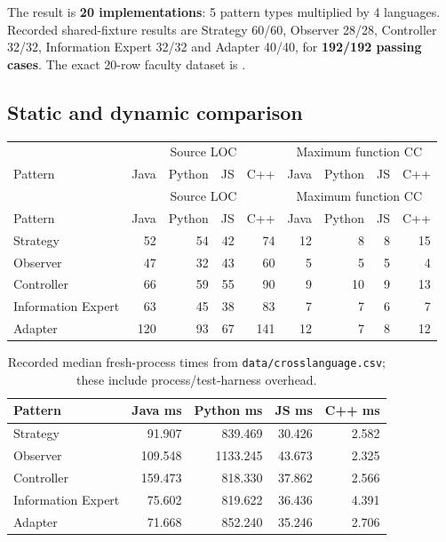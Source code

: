 \documentclass[11pt,a4paper]{article}
\renewcommand{\_}{\textunderscore\allowbreak}
\begin{document}
The result is \textbf{20 implementations}: 5 pattern types multiplied by 4 languages. Recorded shared-fixture results are Strategy 60/60, Observer 28/28, Controller 32/32, Information Expert 32/32 and Adapter 40/40, for \textbf{192/192 passing cases}. The exact 20-row faculty dataset is .

\subsection{Static and dynamic comparison}
\begin{longtable}{lrrrrrrrr}
\toprule & \multicolumn{4}{c}{Source LOC} & \multicolumn{4}{c}{Maximum function CC}\\
Pattern & Java & Python & JS & C++ & Java & Python & JS & C++\\\midrule\endfirsthead
\toprule & \multicolumn{4}{c}{Source LOC} & \multicolumn{4}{c}{Maximum function CC}\\
Pattern & Java & Python & JS & C++ & Java & Python & JS & C++\\\midrule\endhead
Strategy & 52 & 54 & 42 & 74 & 12 & 8 & 8 & 15\\
Observer & 47 & 32 & 43 & 60 & 5 & 5 & 5 & 4\\
Controller & 66 & 59 & 55 & 90 & 9 & 10 & 9 & 13\\
Information Expert & 63 & 45 & 38 & 83 & 7 & 7 & 6 & 7\\
Adapter & 120 & 93 & 67 & 141 & 12 & 7 & 8 & 12\\
\bottomrule
\end{longtable}

\begin{table}[H]\centering\small
\begin{tabular}{lrrrr}\toprule
Pattern & Java ms & Python ms & JS ms & C++ ms\\\midrule
Strategy & 91.907 & 839.469 & 30.426 & 2.582\\
Observer & 109.548 & 1133.245 & 43.673 & 2.325\\
Controller & 159.473 & 818.330 & 37.862 & 2.566\\
Information Expert & 75.602 & 819.622 & 36.436 & 4.391\\
Adapter & 71.668 & 852.240 & 35.246 & 2.706\\
\bottomrule
\end{tabular}
\caption{Recorded median fresh-process times from \texttt{data/cross\_language.csv}; these include process/test-harness overhead.}
\end{table}
\end{document}
